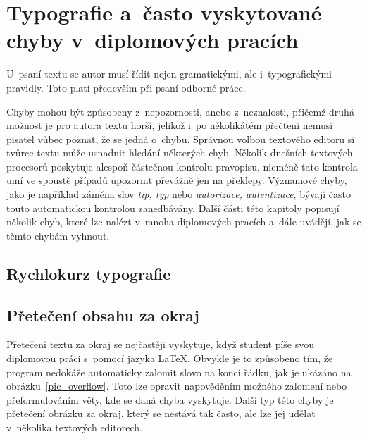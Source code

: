 \dummyShortText[15]





\chapter{Typografie a~často vyskytované chyby v~diplomových pracích}
U~psaní textu se autor musí řídit nejen gramatickými, ale i~typografickými
pravidly. Toto platí především při psaní odborné práce.  

Chyby mohou být způsobeny z~nepozornosti, anebo z~neznalosti, přičemž druhá možnost
je pro autora textu horší, jelikož i~po několikátém přečtení nemusí pisatel vůbec
poznat, že se jedná o~chybu. Správnou volbou textového editoru si tvůrce textu
může usnadnit hledání některých chyb. Několik dnešních textových procesorů poskytuje
alespoň částečnou kontrolu pravopisu, nicméně tato kontrola umí ve spoustě případů
upozornit převážně jen na překlepy. Významové chyby, jako je například záměna slov
\emph{tip, typ} nebo \emph{autorizace, autentizace}, bývají často touto
automatickou kontrolou zanedbávány. Další části této kapitoly popisují několik
chyb, které lze nalézt v~mnoha diplomových pracích a~dále uvádějí, jak se těmto
chybám vyhnout.


\section{Rychlokurz typografie}
\DummyText


\section{Přetečení obsahu za okraj}
Přetečení textu za okraj se nejčastěji vyskytuje, když student píše svou diplomovou
práci s~pomocí jazyka {\LaTeX}. Obvykle je to způsobeno tím, že program nedokáže
automaticky zalomit slovo na konci řádku, jak je ukázáno na
obrázku~\ref{pic_overflow}. Toto lze opravit napověděním možného
zalomení nebo přeformulováním věty, kde se daná chyba vyskytuje.
Další typ této chyby je přetečení obrázku za okraj,
který se nestává tak často, ale lze jej udělat v~několika textových editorech.

